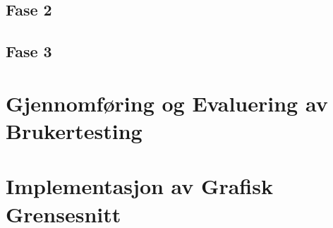 \documentclass[12pt]{article}
\begin{document}
\subsection{Fase 2}

\subsection{Fase 3}

\section{Gjennomføring og Evaluering av Brukertesting}

\section{Implementasjon av Grafisk Grensesnitt}
\end{document}
